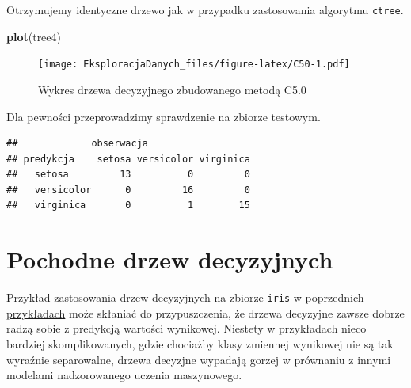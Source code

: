 \documentclass[]{book}
\newenvironment{Shaded}{\begin{snugshade}}{\end{snugshade}}
\newcommand{\DataTypeTok}[1]{\textcolor[rgb]{0.13,0.29,0.53}{#1}}
\newcommand{\KeywordTok}[1]{\textcolor[rgb]{0.13,0.29,0.53}{\textbf{#1}}}
\newcommand{\NormalTok}[1]{#1}
\newcommand{\OperatorTok}[1]{\textcolor[rgb]{0.81,0.36,0.00}{\textbf{#1}}}
\newcommand{\StringTok}[1]{\textcolor[rgb]{0.31,0.60,0.02}{#1}}
\theoremstyle{plain}
\theoremstyle{definition}
\begin{document}
Otrzymujemy identyczne drzewo jak w przypadku zastosowania algorytmu \texttt{ctree}.

\begin{Shaded}
\begin{Highlighting}[]
\KeywordTok{plot}\NormalTok{(tree4)}
\end{Highlighting}
\end{Shaded}

\begin{figure}
\centering
\texttt{[image: EksploracjaDanych\_files/figure-latex/C50-1.pdf]}
\caption{\label{fig:C50}Wykres drzewa decyzyjnego zbudowanego metodą C5.0}
\end{figure}

Dla pewności przeprowadzimy sprawdzenie na zbiorze testowym.

\begin{Shaded}
\end{Shaded}

\begin{verbatim}
##             obserwacja
## predykcja    setosa versicolor virginica
##   setosa         13          0         0
##   versicolor      0         16         0
##   virginica       0          1        15
\end{verbatim}

\hypertarget{pochodne-drzew-decyzyjnych}{%
\chapter{Pochodne drzew decyzyjnych}\label{pochodne-drzew-decyzyjnych}}

Przykład zastosowania drzew decyzyjnych na zbiorze \texttt{iris} w poprzednich \protect\hyperlink{przyk41}{przykładach} może skłaniać do przypuszczenia, że drzewa decyzyjne zawsze dobrze radzą sobie z predykcją wartości wynikowej. Niestety w przykładach nieco bardziej skomplikowanych, gdzie chociażby klasy zmiennej wynikowej nie są tak wyraźnie separowalne, drzewa decyzjne wypadają gorzej w prównaniu z innymi modelami nadzorowanego uczenia maszynowego.
\end{document}
